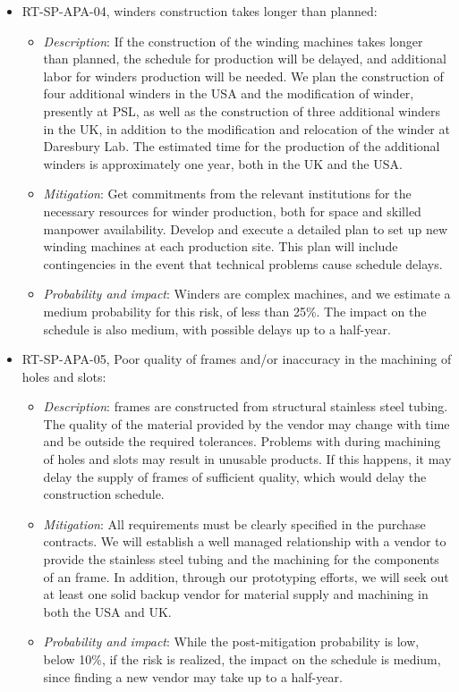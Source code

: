 \begin{itemize}
\item RT-SP-APA-04,  winders construction takes longer than planned:
\begin{itemize} %
\item \textit{Description}: If the construction of the winding machines takes longer than planned, the schedule for  production will be delayed, and additional labor for winders production will be needed. We plan the construction of four additional winders in the USA and the modification of winder, presently at PSL, as well as the construction of three additional winders in the UK, in addition to the modification and relocation of the winder at Daresbury Lab. The estimated time for the production of the additional winders is approximately one year, both in the UK and the USA.
\item \textit{Mitigation}: Get commitments from the relevant institutions for the necessary resources for winder production, both for space and skilled manpower availability. Develop and execute a detailed plan to set up new winding machines at each production site. This plan will include contingencies in the event that technical problems cause schedule delays.  
\item \textit{Probability and impact}: Winders are complex machines, and we estimate a medium probability for this risk, of less than 25\%. The impact on the schedule is also medium, with possible delays up to a half-year.
\end{itemize}

\item RT-SP-APA-05, Poor quality of  frames and/or inaccuracy in the machining of holes and slots:
\begin{itemize} %
\item \textit{Description}:  frames are constructed from structural stainless steel tubing. The quality of the material provided by the vendor may change with time and be outside the required tolerances. Problems with  during machining of holes and slots may result in unusable products. If this happens, it may delay the supply of frames of sufficient quality, which would delay the  construction schedule.
\item \textit{Mitigation}: All requirements must be clearly specified in the purchase contracts. We will establish a well managed relationship with a vendor to provide the stainless steel tubing and the machining for the components of an  frame. In addition, through our prototyping efforts, we will seek out at least one solid backup vendor for material supply and machining in both the USA and UK.
\item \textit{Probability and impact}: While the post-mitigation probability is low, below 10\%, if the risk is realized, the impact on the schedule is medium, since finding a new vendor may take up to a half-year.
\end{itemize}


\end{itemize}
